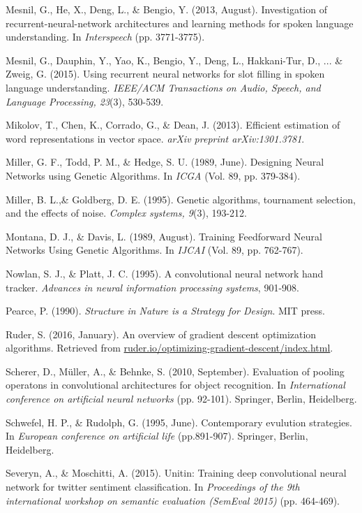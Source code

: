 \documentclass[11pt,a4paper,twoside,openright]{scrbook}
\begin{document}
\begin{thebibliography}{99}
 Mesnil, G., He, X., Deng, L., \& Bengio, Y. (2013, August). Investigation of recurrent-neural-network architectures and learning methods for spoken language understanding. In \emph{Interspeech} (pp. 3771-3775).

 Mesnil, G., Dauphin, Y., Yao, K., Bengio, Y., Deng, L., Hakkani-Tur, D., ... \& Zweig, G. (2015). Using recurrent neural networks for slot filling in spoken language understanding. \emph{IEEE/ACM Transactions on Audio, Speech, and Language Processing, 23}(3), 530-539.

 Mikolov, T., Chen, K., Corrado, G., \& Dean, J. (2013). Efficient estimation of word representations in vector space. \emph{arXiv preprint arXiv:1301.3781}.

 Miller, G. F., Todd, P. M., \& Hedge, S. U. (1989, June). Designing Neural Networks using Genetic Algorithms. In \emph{ICGA} (Vol. 89, pp. 379-384).

 Miller, B. L.,\& Goldberg, D. E. (1995). Genetic algorithms, tournament selection, and the effects of noise. \emph{Complex systems, 9}(3), 193-212.

 Montana, D. J., \& Davis, L. (1989, August). Training Feedforward Neural Networks Using Genetic Algorithms. In \emph{IJCAI} (Vol. 89, pp. 762-767).

 Nowlan, S. J., \& Platt, J. C. (1995). A convolutional neural network hand tracker. \emph{Advances in neural information processing systems}, 901-908.

 Pearce, P. (1990). \emph{Structure in Nature is a Strategy for Design}. MIT press.

 Ruder, S. (2016, January). An overview of gradient descent optimization algorithms. Retrieved from \url{ruder.io/optimizing-gradient-descent/index.html}.

 Scherer, D., Müller, A., \& Behnke, S. (2010, September). Evaluation of pooling operatons in convolutional architectures for object recognition. In \emph{International conference on artificial neural networks} (pp. 92-101). Springer, Berlin, Heidelberg.

 Schwefel, H. P., \& Rudolph, G. (1995, June). Contemporary evulution strategies. In \emph{European conference on artificial life} (pp.891-907). Springer, Berlin, Heidelberg.

 Severyn, A., \& Moschitti, A. (2015). Unitin: Training deep convolutional neural network for twitter sentiment classification. In \emph{Proceedings of the 9th international workshop on semantic evaluation (SemEval 2015)} (pp. 464-469).


\end{thebibliography}
\end{document}
